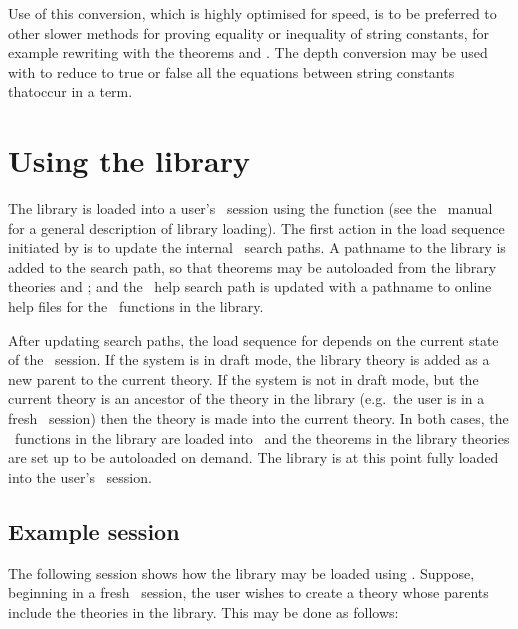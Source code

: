 \noindent Use of this conversion, which is highly optimised for speed, is to be
preferred to other slower methods for proving equality or inequality of string
constants, for example rewriting with the theorems
 and
. The depth conversion
 may be used with  to reduce to true
or false all the equations between string constants that\pagebreak[3] occur in
a term.

\section{Using the library}

The  library is loaded into a user's \HOL\ session using the
function  (see the \HOL\ manual for a general description of
library loading).  The first action in the load sequence initiated by
 is to update the internal \HOL\ search paths.  A pathname to
the  library is added to the search path, so that theorems may be
autoloaded from the library theories  and ; and the \HOL\
help search path is updated with a pathname to online help files for the \ML\
functions in the library.

After updating search paths, the load sequence for  depends on the
current state of the \HOL\ session. If the system is in draft mode, the library
theory  is added as a new parent to the current theory.  If the
system is not in draft mode, but the current theory is an ancestor of the
\ml{string} theory in the library (e.g.\ the user is in a fresh \HOL\ session)
then the  theory is made into the current theory.  In both cases,
the \ML\ functions in the library are loaded into \HOL\, and the theorems in
the library theories are set up to be autoloaded on demand.  The \ml{string}
library is at this point fully loaded into the user's \HOL\ session.

\subsection{Example session}

The following session shows how the  library may be loaded using
. Suppose, beginning in a fresh \HOL\ session, the user
wishes to create a theory \ml{foo} whose parents include the theories in the
\ml{string} library. This may be done as follows:

